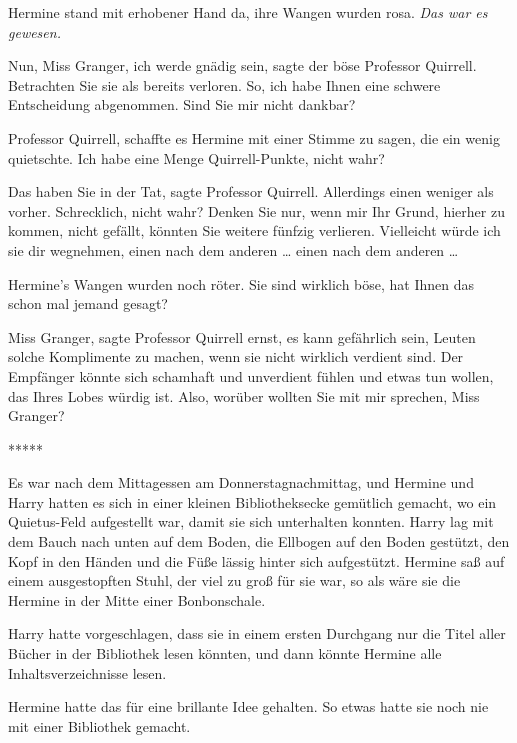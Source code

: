 Hermine stand mit erhobener Hand da, ihre Wangen wurden rosa. \emph{Das war es
gewesen.}

\glqq{}Nun, Miss Granger, ich werde gnädig sein\grqq{}, sagte der böse Professor
Quirrell. \glqq{}Betrachten Sie sie als bereits verloren. So, ich habe Ihnen
eine schwere Entscheidung abgenommen. Sind Sie mir nicht dankbar?\grqq{}

\glqq{}Professor Quirrell\grqq{}, schaffte es Hermine mit einer Stimme zu sagen,
die ein wenig quietschte. \glqq{}Ich habe eine Menge Quirrell-Punkte, nicht
wahr?\grqq{}

\glqq{}Das haben Sie in der Tat\grqq{}, sagte Professor Quirrell. \glqq{}
Allerdings einen weniger als vorher. Schrecklich, nicht wahr? Denken Sie nur,
wenn mir Ihr Grund, hierher zu kommen, nicht gefällt, könnten Sie weitere
fünfzig verlieren. Vielleicht würde ich sie dir wegnehmen, einen nach dem
anderen … einen nach dem anderen …\grqq{}

Hermine's Wangen wurden noch röter. \glqq{}Sie sind wirklich böse, hat Ihnen das
schon mal jemand gesagt?\grqq{}

\glqq{}Miss Granger\grqq{}, sagte Professor Quirrell ernst, \glqq{}es kann
gefährlich sein, Leuten solche Komplimente zu machen, wenn sie nicht wirklich
verdient sind. Der Empfänger könnte sich schamhaft und unverdient fühlen und
etwas tun wollen, das Ihres Lobes würdig ist. Also, worüber wollten Sie mit mir
sprechen, Miss Granger?\grqq{}

\begin{center}*****\end{center}

Es war nach dem Mittagessen am Donnerstagnachmittag, und Hermine und Harry
hatten es sich in einer kleinen Bibliotheksecke gemütlich gemacht, wo ein
Quietus-Feld aufgestellt war, damit sie sich unterhalten konnten. Harry lag mit
dem Bauch nach unten auf dem Boden, die Ellbogen auf den Boden gestützt, den
Kopf in den Händen und die Füße lässig hinter sich aufgestützt. Hermine saß auf
einem ausgestopften Stuhl, der viel zu groß für sie war, so als wäre sie die
Hermine in der Mitte einer Bonbonschale.

Harry hatte vorgeschlagen, dass sie in einem ersten Durchgang nur die Titel
aller Bücher in der Bibliothek lesen könnten, und dann könnte Hermine alle
Inhaltsverzeichnisse lesen.

Hermine hatte das für eine brillante Idee gehalten. So etwas hatte sie noch nie
mit einer Bibliothek gemacht.

